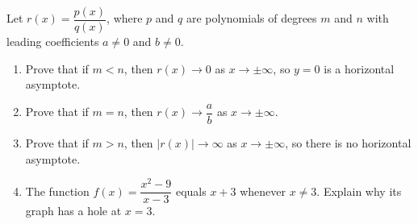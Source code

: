 Let $r(x)=\dfrac{p(x)}{q(x)}$, where $p$ and $q$ are polynomials of degrees $m$ and $n$ with leading coefficients $a\ne0$ and $b\ne0$.
\begin{enumerate}
\item[(a)] Prove that if $m<n$, then $r(x)\to0$ as $x\to\pm\infty$, so $y=0$ is a horizontal asymptote.
\item[(b)] Prove that if $m=n$, then $r(x)\to\dfrac ab$ as $x\to\pm\infty$.
\item[(c)] Prove that if $m>n$, then $\left|r(x)\right|\to\infty$ as $x\to\pm\infty$, so there is no horizontal asymptote.
\item[(d)] The function $f(x)=\dfrac{x^2-9}{x-3}$ equals $x+3$ whenever $x\ne3$. Explain why its graph has a hole at $x=3$.
\end{enumerate}

